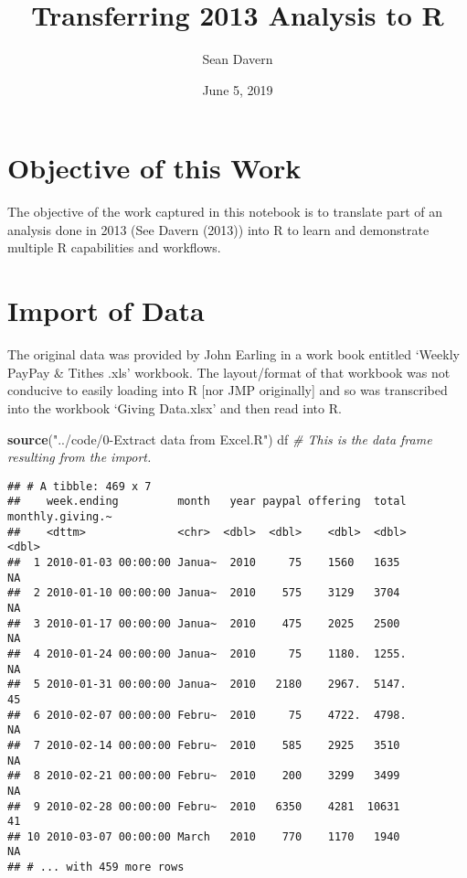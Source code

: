 \documentclass[]{article}
\title{Transferring 2013 Analysis to R}
\author{Sean Davern}
\date{June 5, 2019}
\newenvironment{Shaded}{\begin{snugshade}}{\end{snugshade}}
\newcommand{\CommentTok}[1]{\textcolor[rgb]{0.56,0.35,0.01}{\textit{#1}}}
\newcommand{\KeywordTok}[1]{\textcolor[rgb]{0.13,0.29,0.53}{\textbf{#1}}}
\newcommand{\NormalTok}[1]{#1}
\newcommand{\StringTok}[1]{\textcolor[rgb]{0.31,0.60,0.02}{#1}}
\begin{document}
\maketitle

\hypertarget{objective-of-this-work}{%
\section{Objective of this Work}\label{objective-of-this-work}}

The objective of the work captured in this notebook is to translate part
of an analysis done in 2013 (See Davern (2013)) into R to learn and
demonstrate multiple R capabilities and workflows.

\hypertarget{import-of-data}{%
\section{Import of Data}\label{import-of-data}}

The original data was provided by John Earling in a work book entitled
`Weekly PayPay \& Tithes .xls' workbook. The layout/format of that
workbook was not conducive to easily loading into R {[}nor JMP
originally{]} and so was transcribed into the workbook `Giving
Data.xlsx' and then read into R.

\begin{Shaded}
\begin{Highlighting}[]
\KeywordTok{source}\NormalTok{(}\StringTok{"../code/0-Extract data from Excel.R"}\NormalTok{)}
\NormalTok{df  }\CommentTok{# This is the data frame resulting from the import.}
\end{Highlighting}
\end{Shaded}

\begin{verbatim}
## # A tibble: 469 x 7
##    week.ending         month   year paypal offering  total monthly.giving.~
##    <dttm>              <chr>  <dbl>  <dbl>    <dbl>  <dbl>            <dbl>
##  1 2010-01-03 00:00:00 Janua~  2010     75    1560   1635                NA
##  2 2010-01-10 00:00:00 Janua~  2010    575    3129   3704                NA
##  3 2010-01-17 00:00:00 Janua~  2010    475    2025   2500                NA
##  4 2010-01-24 00:00:00 Janua~  2010     75    1180.  1255.               NA
##  5 2010-01-31 00:00:00 Janua~  2010   2180    2967.  5147.               45
##  6 2010-02-07 00:00:00 Febru~  2010     75    4722.  4798.               NA
##  7 2010-02-14 00:00:00 Febru~  2010    585    2925   3510                NA
##  8 2010-02-21 00:00:00 Febru~  2010    200    3299   3499                NA
##  9 2010-02-28 00:00:00 Febru~  2010   6350    4281  10631                41
## 10 2010-03-07 00:00:00 March   2010    770    1170   1940                NA
## # ... with 459 more rows
\end{verbatim}
\end{document}

